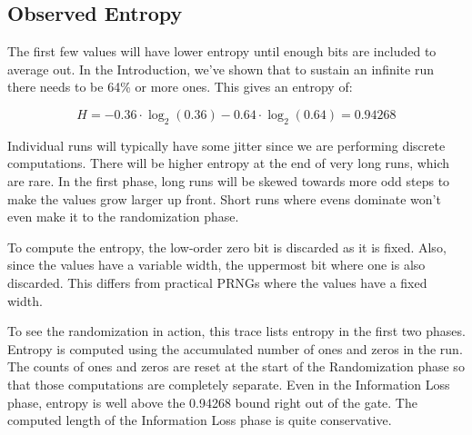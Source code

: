 \documentclass[preprint]{sigplanconf}
\begin{document}
\subsection{Observed Entropy}

The first few values will have lower entropy until enough bits are included to average out. In the Introduction, we've shown that to sustain an infinite run there needs to be 64\% or more ones. This gives an entropy of:

\[ H = -0.36 \cdot \log_2(0.36) - 0.64 \cdot \log_2(0.64) = 0.94268 \]

Individual runs will typically have some jitter since we are performing discrete computations. There will be higher entropy at the end of very long runs, which are rare. In the first phase, long runs will be skewed towards more odd steps to make the values grow larger up front. Short runs where evens dominate won't even make it to the randomization phase.

To compute the entropy, the low-order zero bit is discarded as it is fixed. Also, since the values have a variable width, the uppermost bit where one is also discarded. This differs from practical PRNGs where the values have a fixed width.

To see the randomization in action, this trace lists entropy in the first two phases. Entropy is computed using the accumulated number of ones and zeros in the run. The counts of ones and zeros are reset at the start of the Randomization phase so that those computations are completely separate. Even in the Information Loss phase, entropy is well above the 0.94268 bound right out of the gate. The computed length of the Information Loss phase is quite conservative.
\end{document}
